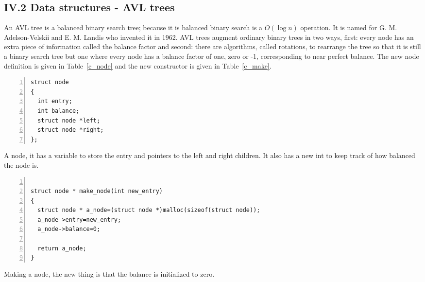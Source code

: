 \documentclass[11pt,a4paper]{scrartcl}
\begin{document}

\subsection*{IV.2 Data structures - AVL trees}

An AVL tree is a balanced binary search tree; because it is balanced
binary search is a $O(\log{n})$ operation. It is named for
G. M. Adelson-Velskii and E. M. Landis who invented it in 1962. AVL
trees augment ordinary binary trees in two ways, first: every node has
an extra piece of information called the balance factor and second:
there are algorithms, called rotations, to rearrange the tree so that
it is still a binary search tree but one where every node has a
balance factor of one, zero or -1, corresponding to near perfect
balance. The new node definition is given in Table~\ref{c_node} and
the new constructor is given in Table~\ref{c_make}.

\begin{table}[b]
\begin{lstlisting}[numbers=left]
struct node
{
  int entry;
  int balance;
  struct node *left;
  struct node *right;
};
\end{lstlisting}
\caption{A node, it has a variable to store the entry and pointers to
  the left and right children. It also has a new int to keep track of
  how balanced the node is.\label{c_node}}
\end{table}


\begin{table}
\begin{lstlisting}[numbers=left]

struct node * make_node(int new_entry)
{
  struct node * a_node=(struct node *)malloc(sizeof(struct node));
  a_node->entry=new_entry;
  a_node->balance=0;

  return a_node;
}
\end{lstlisting}
\caption{Making a node, the new thing is that the balance is initialized to zero.\label{c_make}}
\end{table}
\end{document}
